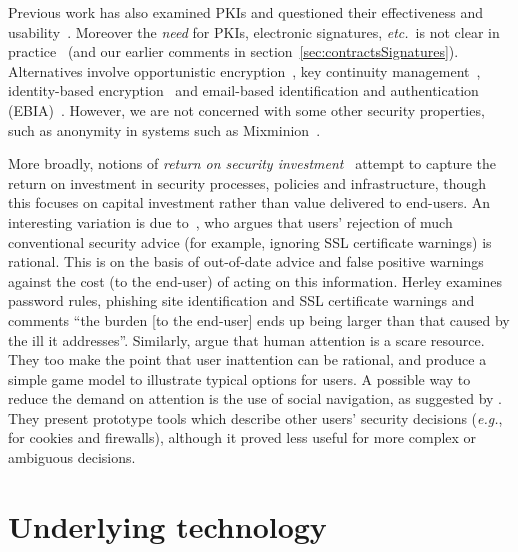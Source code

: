\documentclass{article}
\def\citeN{\citet}
\def\cite{\citep}
\newcommand{\eg}{\textit{e.g.}}
\newcommand{\etc}{\textit{etc.}}
\begin{document}
Previous work has also examined PKIs and questioned their
effectiveness and usability~\cite{Gutmann03,Straub+04}.  Moreover the
\emph{need} for PKIs, electronic signatures, \etc\ is not clear in
practice~\cite{Bileta11a} (and our earlier comments in section~\ref{sec:contractsSignatures}).  Alternatives involve opportunistic
encryption~\cite{Garfinkel03}, key continuity
management~\cite{Gutmann04b,Garfinkel+05}, identity-based
encryption~\cite{Shamir85,Martin06} and email-based identification and
authentication (EBIA)~\cite{Garfinkel03b}.  However, we are not
concerned with some other security properties, such as anonymity in
systems such as Mixminion~\cite{Mathewson+04}. 

More broadly, notions of
\textit{return on security investment}~\cite{mNIST05} attempt to capture
the return on investment in security processes, policies and infrastructure,
though this focuses on capital investment rather than value
delivered to end-users. 
An interesting variation is due to~\citeN{Herley09}, who argues that
users' rejection of much conventional security advice (for example,
ignoring SSL certificate warnings) is rational.  This is on the basis
of out-of-date advice and false positive warnings against the cost (to
the end-user) of acting on this information.  Herley examines password
rules, phishing site identification and SSL certificate warnings and
comments “the burden [to the end-user] ends up being larger than that
caused by the ill it addresses”.  Similarly, \citeN{Bohme+11} argue
that human attention is a scare resource.  They too make the point
that user inattention can be rational, and produce a simple game model
to illustrate typical options for users.  A possible way to reduce the
demand on attention is the use of social navigation, as suggested by
\citeN{Goecks+09}.  They present prototype tools which describe other
users' security decisions (\eg, for cookies and firewalls), although
it proved less useful for more complex or ambiguous decisions.

\section{Underlying technology}\label{sec:tech}
\end{document}
